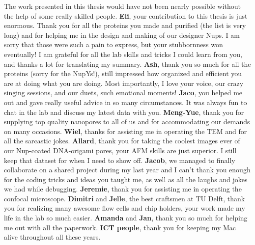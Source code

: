 \noindent The work presented in this thesis would have not been nearly possible without the help of some really skilled people. \textbf{Eli}, your contribution to this thesis is just enormous. Thank you for all the proteins you made and purified (the list is very long) and for helping me in the design and making of our designer Nups. I am sorry that those were such a pain to express, but your stubbornness won eventually! I am grateful for all the lab skills and tricks I could learn from you, and thanks a lot for translating my summary. \textbf{Ash}, thank you so much for all the proteins (sorry for the NupYs!), still impressed how organized and efficient you are at doing what you are doing. Most importantly, I love your voice, our crazy singing sessions, and our duets, such emotional moments! \textbf{Jaco}, you helped me out and gave really useful advice in so many circumstances. It was always fun to chat in the lab and discuss my latest data with you. \textbf{Meng-Yue}, thank you for supplying top quality nanopores to all of us and for accommodating our demands on many occasions. \textbf{Wiel}, thanks for assisting me in operating the TEM and for all the sarcastic jokes. \textbf{Allard}, thank you for taking the coolest images ever of our Nup-coated DNA-origami pores, your AFM skills are just superior. I still keep that dataset for when I need to show off. \textbf{Jacob}, we managed to finally collaborate on a shared project during my last year and I can't thank you enough for the coding tricks and ideas you taught me, as well as all the laughs and jokes we had while debugging. \textbf{Jeremie}, thank you for assisting me in operating the confocal microscope.  \textbf{Dimitri} and \textbf{Jelle}, the best craftsmen at TU Delft, thank you for realizing many awesome flow cells and chip holders, your work made my life in the lab so much easier. \textbf{Amanda} and \textbf{Jan}, thank you so much for helping me out with all the paperwork. \textbf{ICT people}, thank you for keeping my Mac alive throughout all these years. \\[0.5pt]

